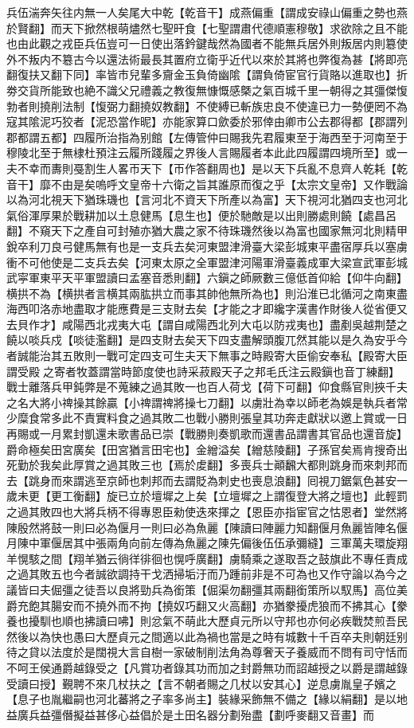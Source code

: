 兵伍湍奔矢往内無一人矣尾大中乾【乾音干】成燕偏重【謂成安祿山偏重之勢也燕於賢翻】而天下掀然根萌燼然七聖旰食【七聖謂肅代德順憲穆敬】求欲除之且不能也由此觀之戎臣兵伍豈可一日使出落鈐鍵哉然為國者不能無兵居外則叛居内則簒使外不叛内不簒古今以還法術最長其置府立衛乎近代以來於其將也弊復為甚【將即亮翻復扶又翻下同】率皆市兒輩多齎金玉負倚幽隂【謂負倚宦官行貨賂以進取也】折劵交貨所能致也絶不識父兄禮義之教復無慷慨感槩之氣百城千里一朝得之其彊傑愎勃者則撓削法制【愎弼力翻撓奴教翻】不使縛已斬族忠良不使違已力一勢便罔不為寇其隂泥巧狡者【泥恐當作昵】亦能家算口歛委於邪倖由卿市公去郡得都【郡謂列郡都謂五都】四履所治指為别館【左傳管仲曰賜我先君履東至于海西至于河南至于穆陵北至于無棣杜預注云履所踐履之界後人言賜履者本此此四履謂四境所至】或一夫不幸而夀則戞割生人畧帀天下【帀作答翻周也】是以天下兵亂不息齊人乾耗【乾音干】靡不由是矣嗚呼文皇帝十六衛之旨其誰原而復之乎【太宗文皇帝】又作戰論以為河北視天下猶珠璣也【言河北不資天下所產以為富】天下視河北猶四支也河北氣俗渾厚果於戰耕加以土息健馬【息生也】便於馳敵是以出則勝處則饒【處昌呂翻】不窺天下之產自可封殖亦猶大農之家不待珠璣然後以為富也國家無河北則精甲銳卒利刀良弓健馬無有也是一支兵去矣河東盟津滑臺大梁彭城東平盡宿厚兵以塞虜衝不可他使是二支兵去矣【河東太原之全軍盟津河陽軍滑臺義成軍大梁宣武軍彭城武寜軍東平天平軍盟讀曰孟塞音悉則翻】六鎭之師厥數三億低首仰給【仰牛向翻】横拱不為【横拱者言横其兩肱拱立而事其帥他無所為也】則沿淮已北循河之南東盡海西叩洛赤地盡取才能應費是三支財去矣【才能之才即纔字漢書作財後人從省便又去貝作才】咸陽西北戎夷大屯【謂自咸陽西北列大屯以防戎夷也】盡剷吳越荆楚之饒以啖兵戍【啖徒濫翻】是四支財去矣天下四支盡解頭腹兀然其能以是久為安乎今者誠能治其五敗則一戰可定四支可生夫天下無事之時殿寄大臣偷安奉私【殿寄大臣謂受殿之寄者牧蓋謂當時節度使也詩采菽殿天子之邦毛氏注云殿鎭也音丁練翻】戰士離落兵甲鈍弊是不蒐練之過其敗一也百人荷戈【荷下可翻】仰食縣官則挾千夫之名大將小禆操其餘贏【小禆謂禆將操七刀翻】以虜壯為幸以師老為娛是執兵者常少糜食常多此不責實料食之過其敗二也戰小勝則張皇其功奔走獻狀以邀上賞或一日再賜或一月累封凱還未歌書品已崇【戰勝則奏凱歌而還書品謂書其官品也還音旋】爵命極矣田宮廣矣【田宮猶言田宅也】金繒溢矣【繒慈陵翻】子孫官矣焉肯搜奇出死勤於我矣此厚賞之過其敗三也【焉於䖍翻】多喪兵士顚飜大都則跳身而來刺邦而去【跳身而來謂逃至京師也刺邦而去謂貶為刺史也喪息浪翻】囘視刀鋸氣色甚安一歲未更【更工衡翻】旋已立於壇墀之上矣【立壇墀之上謂復登大將之壇也】此輕罰之過其敗四也大將兵柄不得專恩臣勑使迭來揮之【恩臣亦指宦官之怙恩者】堂然將陳殷然將鼓一則曰必為偃月一則曰必為魚麗【陳讀曰陣麗力知翻偃月魚麗皆陣名偃月陳中軍偃居其中張兩角向前左傳為魚麗之陳先偏後伍伍承彌縫】三軍萬夫環旋翔羊愰駭之間【翔羊猶云徜徉徘徊也愰呼廣翻】虜騎乘之遂取吾之鼓旗此不專任責成之過其敗五也今者誠欲調持干戈洒掃垢汙而乃踵前非是不可為也又作守論以為今之議皆曰夫倔彊之徒吾以良將勁兵為銜策【倔渠勿翻彊其兩翻銜策所以馭馬】高位美爵充飽其腸安而不撓外而不拘【撓奴巧翻又火高翻】亦猶豢擾虎狼而不拂其心【豢養也擾馴也順也拂讀曰咈】則忿氣不萌此大歷貞元所以守邦也亦何必疾戰焚煎吾民然後以為快也愚曰大歷貞元之間適以此為禍也當是之時有城數十千百卒夫則朝廷别待之貸以法度於是闊視大言自樹一家破制削法角為尊奢天子養威而不問有司守恬而不呵王侯通爵越錄受之【凡賞功者錄其功而加之封爵無功而詔越授之以爵是謂越錄受讀曰授】覲聘不來几杖扶之【言不朝者賜之几杖以安其心】逆息虜胤皇子嬪之【息子也胤繼嗣也河北蕃將之子率多尚主】裝緣采飾無不備之【緣以絹翻】是以地益廣兵益彊僭擬益甚侈心益倡於是土田名器分劃殆盡【劃呼麥翻又音畫】而